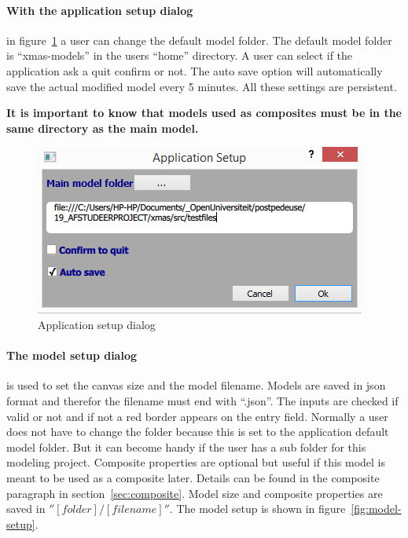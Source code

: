 \paragraph{With the application setup dialog} in figure~\ref{fig:app-setup} a
user can change the default model folder. The default model folder is
``xmas-models'' in the users ``home'' directory. A user can select if the
application ask a quit confirm or not. The auto save option will automatically
save the actual modified model every 5 minutes. All these settings are
persistent.\\

\begin{tcolorbox}[colback=white]
\textbf{
It is important to know that models used as composites must be in the same
directory as the main model.
}
\end{tcolorbox}
   
\begin{figure}[t]
\begin{center}	
	\includegraphics[width=.70\linewidth]{pictures/app-setup}
	\caption{Application setup dialog}
	\label{fig:app-setup}
\end{center}
\end{figure}

\paragraph{The model setup dialog}is used to set the canvas size and the model
filename. Models are saved in json format and therefor the filename must end
with ``.json''. The inputs are checked if valid or not and if not a red border
appears on the entry field. Normally a user does not have to change the folder
because this is set to the application default model folder. But it can become
handy if the user has a sub folder for this modeling project. Composite
properties are optional but useful if this model is meant to be used as a
composite later. Details can be found in the composite paragraph in
section~\ref{sec:composite}. Model size and composite properties are saved in
$''[folder]/[filename]''$. The model setup is shown in
figure~\ref{fig:model-setup}.


